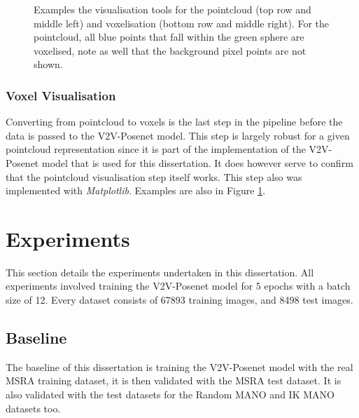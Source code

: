 \begin{figure}
\caption{Examples the visualisation tools for the pointcloud (top row and middle left) and voxelisation (bottom row and middle right). For the pointcloud, all blue points that fall within the green sphere are voxelised, note as well that the background pixel points are not shown.}
\label{fig:es:pc}
\end{figure}

\subsubsection{Voxel Visualisation}
Converting from pointcloud to voxels is the last step in the pipeline before the data is passed to the V2V-Posenet model. This step is largely robust for a given pointcloud representation since it is part of the implementation of the V2V-Posenet model that is used for this dissertation. It does however serve to confirm that the pointcloud visualisation step itself works. This step also was implemented with {\slshape Matplotlib}. Examples are also in Figure \ref{fig:es:pc}.




\section{Experiments}
\label{es:exp}
This section details the experiments undertaken in this dissertation. All experiments involved training the V2V-Posenet model for 5 epochs with a batch size of 12. Every dataset consists of 67893 training images, and 8498 test images.

\subsection{Baseline}
\label{es:ex:base}
The baseline of this dissertation is training the V2V-Posenet model with the real MSRA training dataset, it is then validated with the MSRA test dataset. It is also validated with the test datasets for the Random MANO and IK MANO datasets too.

